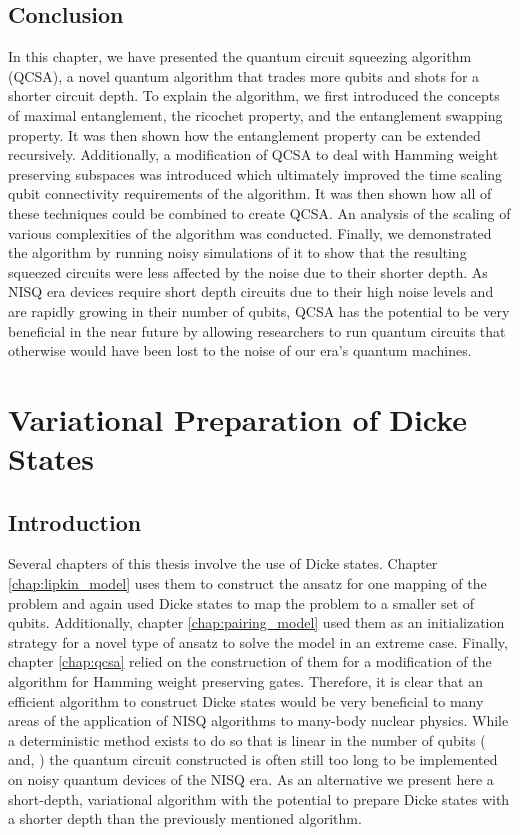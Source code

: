 \documentclass[10pt]{article}
\begin{document}
\section{Conclusion}

In this chapter, we have presented the quantum circuit squeezing algorithm (QCSA), a novel quantum algorithm that trades more qubits and shots for a shorter circuit depth. To explain the algorithm, we first introduced the concepts of maximal entanglement, the ricochet property, and the entanglement swapping property. It was then shown how the entanglement property can be extended recursively. Additionally, a modification of QCSA to deal with Hamming weight preserving subspaces was introduced which ultimately improved the time scaling qubit connectivity requirements of the algorithm. It was then shown how all of these techniques could be combined to create QCSA. An analysis of the scaling of various complexities of the algorithm was conducted. Finally, we demonstrated the algorithm by running noisy simulations of it to show that the resulting squeezed circuits were less affected by the noise due to their shorter depth. As NISQ era devices require short depth circuits due to their high noise levels and are rapidly growing in their number of qubits, QCSA has the potential to be very beneficial in the near future by allowing researchers to run quantum circuits that otherwise would have been lost to the noise of our era's quantum machines.

\chapter{Variational Preparation of Dicke States}
\label{chap:vpds}

\section{Introduction}

Several chapters of this thesis involve the use of Dicke states. Chapter \ref{chap:lipkin_model} uses them to construct the ansatz for one mapping of the problem and again used Dicke states to map the problem to a smaller set of qubits. Additionally, chapter \ref{chap:pairing_model} used them as an initialization strategy for a novel type of ansatz to solve the model in an extreme case. Finally, chapter \ref{chap:qcsa} relied on the construction of them for a modification of the algorithm for Hamming weight preserving gates. Therefore, it is clear that an efficient algorithm to construct Dicke states would be very beneficial to many areas of the application of NISQ algorithms to many-body nuclear physics. While a deterministic method exists to do so that is linear in the number of qubits (\cite{ref:dicke_prep} and, \cite{ref:dicke_prep_dac}) the quantum circuit constructed is often still too long to be implemented on noisy quantum devices of the NISQ era. As an alternative we present here a short-depth, variational algorithm with the potential to prepare Dicke states with a shorter depth than the previously mentioned algorithm.
\end{document}
